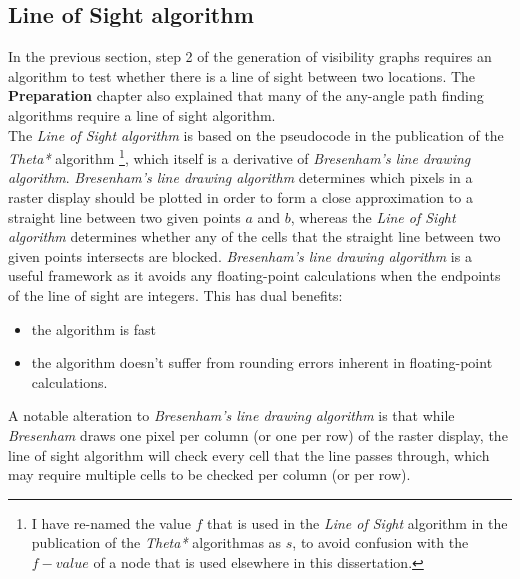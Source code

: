 \documentclass[12pt,notitlepage]{report}
\begin{document}
\subsection{Line of Sight algorithm}
In the previous section, step 2 of the generation of visibility graphs requires an algorithm to test whether there is a line of sight between two locations. The {\bfseries Preparation} chapter also explained that many of the any-angle path finding algorithms require a line of sight algorithm.\\

\noindent
The {\em Line of Sight algorithm} is based on the pseudocode in the publication of the {\em Theta*} algorithm \cite{Daniel10}\footnote{I have re-named the value $f$ that is used in the {\em Line of Sight} algorithm in the publication of the {\em Theta*} algorithmas as $s$, to avoid confusion with the $f-value$ of a node that is used elsewhere in this dissertation.}, which itself is a derivative of {\em Bresenham's line drawing algorithm}\cite{Bresenham65}. {\em Bresenham's line drawing algorithm} determines which pixels in a raster display should be plotted in order to form a close approximation to a straight line between two given points $a$ and $b$, whereas the {\em Line of Sight algorithm} determines whether any of the cells that the straight line between two given points intersects are blocked. {\em Bresenham's line drawing algorithm} is a useful framework as it avoids any floating-point calculations when the endpoints of the line of sight are integers. This has dual benefits:
\begin{itemize}
\item the algorithm is fast
\item the algorithm doesn't suffer from rounding errors inherent in floating-point calculations. 
\end{itemize}
\noindent
A notable alteration to {\em Bresenham's line drawing algorithm} is that while {\em Bresenham} draws one pixel per column (or one per row) of the raster display, the line of sight algorithm will check every cell that the line passes through, which may require multiple cells to be checked per column (or per row).\\
\end{document}
